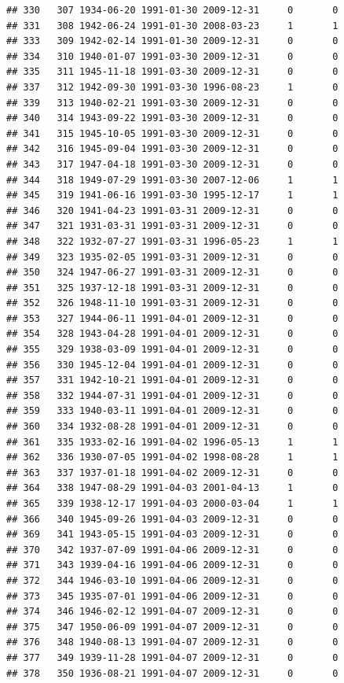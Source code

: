 \documentclass[
]{book}
\begin{document}
\begin{verbatim}
## 330   307 1934-06-20 1991-01-30 2009-12-31     0       0
## 331   308 1942-06-24 1991-01-30 2008-03-23     1       1
## 333   309 1942-02-14 1991-01-30 2009-12-31     0       0
## 334   310 1940-01-07 1991-03-30 2009-12-31     0       0
## 335   311 1945-11-18 1991-03-30 2009-12-31     0       0
## 337   312 1942-09-30 1991-03-30 1996-08-23     1       0
## 339   313 1940-02-21 1991-03-30 2009-12-31     0       0
## 340   314 1943-09-22 1991-03-30 2009-12-31     0       0
## 341   315 1945-10-05 1991-03-30 2009-12-31     0       0
## 342   316 1945-09-04 1991-03-30 2009-12-31     0       0
## 343   317 1947-04-18 1991-03-30 2009-12-31     0       0
## 344   318 1949-07-29 1991-03-30 2007-12-06     1       1
## 345   319 1941-06-16 1991-03-30 1995-12-17     1       1
## 346   320 1941-04-23 1991-03-31 2009-12-31     0       0
## 347   321 1931-03-31 1991-03-31 2009-12-31     0       0
## 348   322 1932-07-27 1991-03-31 1996-05-23     1       1
## 349   323 1935-02-05 1991-03-31 2009-12-31     0       0
## 350   324 1947-06-27 1991-03-31 2009-12-31     0       0
## 351   325 1937-12-18 1991-03-31 2009-12-31     0       0
## 352   326 1948-11-10 1991-03-31 2009-12-31     0       0
## 353   327 1944-06-11 1991-04-01 2009-12-31     0       0
## 354   328 1943-04-28 1991-04-01 2009-12-31     0       0
## 355   329 1938-03-09 1991-04-01 2009-12-31     0       0
## 356   330 1945-12-04 1991-04-01 2009-12-31     0       0
## 357   331 1942-10-21 1991-04-01 2009-12-31     0       0
## 358   332 1944-07-31 1991-04-01 2009-12-31     0       0
## 359   333 1940-03-11 1991-04-01 2009-12-31     0       0
## 360   334 1932-08-28 1991-04-01 2009-12-31     0       0
## 361   335 1933-02-16 1991-04-02 1996-05-13     1       1
## 362   336 1930-07-05 1991-04-02 1998-08-28     1       1
## 363   337 1937-01-18 1991-04-02 2009-12-31     0       0
## 364   338 1947-08-29 1991-04-03 2001-04-13     1       0
## 365   339 1938-12-17 1991-04-03 2000-03-04     1       1
## 366   340 1945-09-26 1991-04-03 2009-12-31     0       0
## 369   341 1943-05-15 1991-04-03 2009-12-31     0       0
## 370   342 1937-07-09 1991-04-06 2009-12-31     0       0
## 371   343 1939-04-16 1991-04-06 2009-12-31     0       0
## 372   344 1946-03-10 1991-04-06 2009-12-31     0       0
## 373   345 1935-07-01 1991-04-06 2009-12-31     0       0
## 374   346 1946-02-12 1991-04-07 2009-12-31     0       0
## 375   347 1950-06-09 1991-04-07 2009-12-31     0       0
## 376   348 1940-08-13 1991-04-07 2009-12-31     0       0
## 377   349 1939-11-28 1991-04-07 2009-12-31     0       0
## 378   350 1936-08-21 1991-04-07 2009-12-31     0       0

\end{verbatim}
\end{document}
